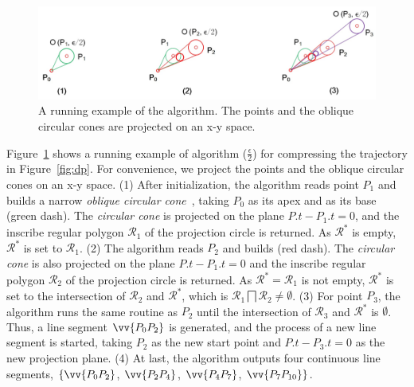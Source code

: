 \begin{figure}[tb!]
	\centering
	\includegraphics[scale=0.66]{Figures/Fig-Conest.jpg}
	\vspace{-1ex}
	\caption{\small A running example of the \cised algorithm. The points and the oblique circular cones are projected on an x-y space. }%
	\vspace{-2ex}
	\label{fig:exm-conest}
\end{figure}

\begin{example}
	\label{exm-alg-conest}
	Figure~\ref{fig:exm-conest} shows a running example of algorithm \cised($\frac{\epsilon}{2}$) for compressing the trajectory  in Figure~\ref{fig:dp}.
	For convenience, we project the points and the oblique circular cones on an x-y space.
	(1) After initialization, the \cised algorithm reads point $P_1$ and builds a narrow \emph{oblique circular cone}~, taking $P_0$ as its apex and  as its base (green dash). The \emph{circular cone} is projected on the plane $P.t-P_1.t=0$, and the inscribe regular polygon $\mathcal{R}_1$ of the projection circle is returned. As $\mathcal{R}^*$ is empty, $\mathcal{R}^*$ is set to $\mathcal{R}_1$.
	(2) The algorithm reads $P_2$ and builds  (red dash). The \emph{circular cone} is also projected on the plane $P.t-P_1.t=0$ and the inscribe regular polygon $\mathcal{R}_2$ of the projection circle is returned. As $\mathcal{R}^*=\mathcal{R}_1$ is not empty, $\mathcal{R}^*$ is set to the intersection of $\mathcal{R}_2$ and $\mathcal{R}^*$, which is $\mathcal{R}_1 \bigsqcap \mathcal{R}_2 \ne \emptyset$.
	(3) For point $P_3$, the algorithm runs the same routine as $P_2$ until the intersection of $\mathcal{R}_3$ and $\mathcal{R}^*$ is $\emptyset$. Thus, a line segment $\vv{P_0P_2}$ is generated, and the process of a new line segment is started, taking $P_2$ as the new start point and $P.t-P_3.t=0$ as the new projection plane.
	(4) At last, the algorithm outputs four continuous line segments, \ie $\{\vv{P_0P_2}$, $\vv{P_2P_4}$, $\vv{P_4P_{7}}$, $\vv{P_7P_{10}}\}$. %
\end{example} 	


